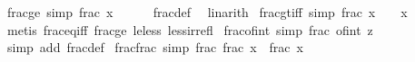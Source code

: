 \begin{isabellebody}
\ frac{\isacharunderscore}{\kern0pt}ge{\isacharunderscore}{\kern0pt}{}\ {\isacharbrackleft}{\kern0pt}simp{\isacharbrackright}{\kern0pt}{\isacharcolon}{\kern0pt}\ {\isachardoublequoteopen}frac\ x\ {\isasymge}\ {}{\isachardoublequoteclose}\isanewline
%
\isadelimproof
\ \ %
\endisadelimproof
%
\isatagproof
{}\isamarkupfalse%
\ frac{\isacharunderscore}{\kern0pt}def\ \isamarkupfalse%
\ linarith%
\endisatagproof
{\isafoldproof}%
%
\isadelimproof
\isanewline
%
\endisadelimproof
\isanewline
{}\isamarkupfalse%
\ frac{\isacharunderscore}{\kern0pt}gt{\isacharunderscore}{\kern0pt}{}{\isacharunderscore}{\kern0pt}iff\ {\isacharbrackleft}{\kern0pt}simp{\isacharbrackright}{\kern0pt}{\isacharcolon}{\kern0pt}\ {\isachardoublequoteopen}frac\ x\ {\isachargreater}{\kern0pt}\ {}\ {\isasymlongleftrightarrow}\ x\ {\isasymnotin}\ {\isasymint}{\isachardoublequoteclose}\isanewline
%
\isadelimproof
\ \ %
\endisadelimproof
%
\isatagproof
{}\isamarkupfalse%
\ {\isacharparenleft}{\kern0pt}metis\ frac{\isacharunderscore}{\kern0pt}eq{\isacharunderscore}{\kern0pt}{}{\isacharunderscore}{\kern0pt}iff\ frac{\isacharunderscore}{\kern0pt}ge{\isacharunderscore}{\kern0pt}{}\ le{\isacharunderscore}{\kern0pt}less\ less{\isacharunderscore}{\kern0pt}irrefl{\isacharparenright}{\kern0pt}%
\endisatagproof
{\isafoldproof}%
%
\isadelimproof
\isanewline
%
\endisadelimproof
\isanewline
{}\isamarkupfalse%
\ frac{\isacharunderscore}{\kern0pt}of{\isacharunderscore}{\kern0pt}int\ {\isacharbrackleft}{\kern0pt}simp{\isacharbrackright}{\kern0pt}{\isacharcolon}{\kern0pt}\ {\isachardoublequoteopen}frac\ {\isacharparenleft}{\kern0pt}of{\isacharunderscore}{\kern0pt}int\ z{\isacharparenright}{\kern0pt}\ {\isacharequal}{\kern0pt}\ {}{\isachardoublequoteclose}\isanewline
%
\isadelimproof
\ \ %
\endisadelimproof
%
\isatagproof
{}\isamarkupfalse%
\ {\isacharparenleft}{\kern0pt}simp\ add{\isacharcolon}{\kern0pt}\ frac{\isacharunderscore}{\kern0pt}def{\isacharparenright}{\kern0pt}%
\endisatagproof
{\isafoldproof}%
%
\isadelimproof
\isanewline
%
\endisadelimproof
\isanewline
{}\isamarkupfalse%
\ frac{\isacharunderscore}{\kern0pt}frac\ {\isacharbrackleft}{\kern0pt}simp{\isacharbrackright}{\kern0pt}{\isacharcolon}{\kern0pt}\ {\isachardoublequoteopen}frac\ {\isacharparenleft}{\kern0pt}frac\ x{\isacharparenright}{\kern0pt}\ {\isacharequal}{\kern0pt}\ frac\ x{\isachardoublequoteclose}\isanewline
%
\isadelimproof
\ \ %
\endisadelimproof
%
\isatagproof

\end{isabellebody}
